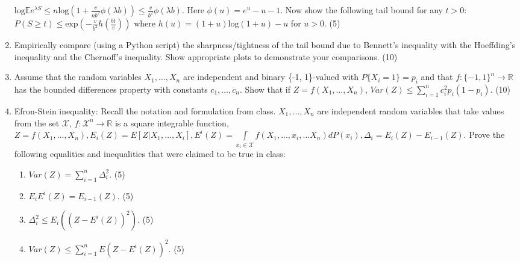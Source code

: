 \documentclass[journal,12pt,twocolumn]{IEEEtran}
\begin{document}
\begin{enumerate}
{$\text{log} {\mathbb{E}}e^{\lambda S} \leq n\text{log} (1 + \frac{v}{nb^2} \phi(\lambda b)) \leq \frac{v}{b^2}\phi(\lambda b)$. Here $\phi(u) = e^u - u - 1$. Now show the following tail bound for any $t > 0$:
 $P(S \geq t) \leq \text{exp}(-\frac{v}{b^2}h(\frac{bt}{v}))$ where $h(u) = (1 + u)\text{log}(1 + u) - u$ for $u > 0$. 
   (5)} 
\item{Empirically compare (using a Python script) the sharpness/tightness of the tail bound due to Bennett's inequality with the Hoeffding's inequality and the Chernoff's inequality. Show appropriate plots to demonstrate your comparisons. (10)}
\item{
Assume that the random variables $X_1, \ldots, X_n$ are independent and binary \{-1, 1\}-valued with $P\{X_i = 1\} = p_i$ and that $f:\{-1, 1\}^n \longrightarrow \mathbb{R}$ has the bounded differences property with constants $c_1, \ldots, c_n$. Show that if $Z = f(X_1, \ldots, X_n)$, $Var(Z) \leq \sum\limits_{i=1}^nc_i^2p_i(1 - p_i)$. (10) 
}

    \item{Efron-Stein inequality: Recall the notation and formulation from class. $X_1, \ldots, X_n$ are independent random variables that take values from the set $\mathcal{X}$, $f: \mathcal{X}^n \longrightarrow \mathbb{R}$ is a square integrable function, $Z = f(X_1, \ldots, X_n), E_i(Z) = E[Z|X_1, \ldots, X_i], E^i(Z) = \int\limits_{x_i \in \mathcal{X}} f(X_1, \ldots, x_i, \ldots X_n) dP(x_i), \Delta_i = E_i(Z) - E_{i-1}(Z)$. Prove the following equalities and inequalities that were claimed to be true in class: 
        \begin{enumerate}
        \item{$Var(Z) = \sum\limits_{i=1}^n\Delta_i^2$. (5)}
        \item{$E_iE^i(Z) = E_{i-1}(Z)$. (5)}
        \item{$\Delta_i^2 \leq E_i((Z - E^i(Z))^2)$. (5)}
        \item{$Var(Z) \leq \sum\limits_{i=1}^n E(Z - E^i(Z))^2$. (5)}
        \end{enumerate}
        }
\end{enumerate}
\end{document}
